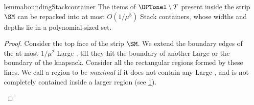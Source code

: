\begin{restatable}{lemma}{boundingStackcontainer}
\label{lem:boundingStackcontainer}
    The items of $\OPTonel \setminus T$ present inside the strip $\SM$ can be repacked into at most $O(1/\mu^8)$ Stack containers, whose widths and depths lie in a polynomial-sized set.
\end{restatable}
\begin{proof}
Consider the top face of the strip $\SM$. We extend the boundary edges of the at most $1/\mu^2$ Large , till they hit the boundary of another Large  or the boundary of the knapsack. Consider all the rectangular regions formed by these lines. We call a region to be \textit{maximal} if it does not contain any Large , and is not completely contained inside a larger region (see \cref{fig:maximal-regions}).
    \begin{figure}
        \centering
                
                
                
        
        \caption{}
        \label{fig:maximal-regions}
    \end{figure}
    

\end{proof}
